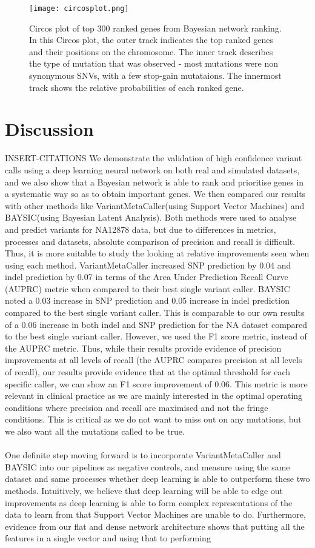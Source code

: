\documentclass{article}
\begin{document}
\begin{figure}[H]
\texttt{[image: circosplot.png]}
\caption{Circos plot of top 300 ranked genes from Bayesian network ranking. In this Circos plot, the outer track indicates the top ranked genes and their positions on the chromosome. The inner track describes the type of mutation that was observed - most mutations were non synonymous SNVs, with a few stop-gain mutataions. The innermost track shows the relative probabilities of each ranked gene.}
\centering
\end{figure}

\newpage
\section{Discussion}
INSERT-CITATIONS
We demonstrate the validation of high confidence variant calls using a deep learning neural network on both real and simulated datasets, and we also show that a Bayesian network is able to rank and prioritise genes in a systematic way so as to obtain important genes. We then compared our results with other methods like VariantMetaCaller(using Support Vector Machines) and BAYSIC(using Bayesian Latent Analysis). Both methods were used to analyse and predict variants for NA12878 data, but due to differences in metrics, processes and datasets, absolute comparison of precision and recall is difficult. Thus, it is more suitable to study the looking at relative improvements seen when using each method. VariantMetaCaller increased SNP prediction by 0.04 and indel prediction by 0.07 in terms of the Area Under Prediction Recall Curve (AUPRC) metric when compared to their best single variant caller. BAYSIC noted a 0.03 increase in SNP prediction and 0.05 increase in indel prediction compared to the best single variant caller. This is comparable to our own results of a 0.06 increase in both indel and SNP prediction for the NA dataset compared to the best single variant caller. However, we used the F1 score metric, instead of the AUPRC metric. Thus, while their results provide evidence of precision improvements at all levels of recall (the AUPRC compares precision at all levels of recall), our results provide evidence that at the optimal threshold for each specific caller, we can show an F1 score improvement of 0.06. This metric is more relevant in clinical practice as we are mainly interested in the optimal operating conditions where precision and recall are maximised and not the fringe conditions. This is critical as we do not want to miss out on any mutations, but we also want all the mutations called to be true. \\\\ One definite step moving forward is to incorporate VariantMetaCaller and BAYSIC into our pipelines as negative controls, and measure using the same dataset and same processes whether deep learning is able to outperform these two methods. Intuitively, we believe that deep learning will be able to edge out improvements as deep learning is able to form complex representations of the data to learn from that Support Vector Machines are unable to do. Furthermore, evidence from our flat and dense network architecture shows that putting all the features in a single vector and using that to performing 
\end{document}
